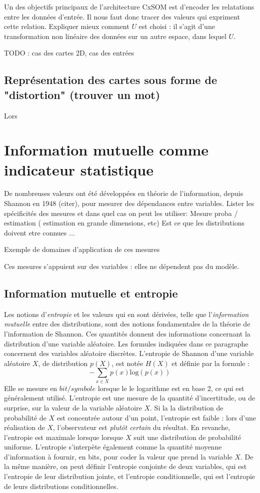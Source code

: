 Un des objectifs principaux de l'architecture CxSOM est d'encoder les relatations entre les données d'entrée. Il nous faut donc tracer des valeurs qui expriment cette relation. 
Expliquer mieux comment $U$ est choisi : il s'agit d'une transformation non linéaire des données sur un autre espace, dans lequel $U$.

TODO : cas des cartes 2D, cas des entrées 


\subsection{Représentation des cartes sous forme de "distortion" (trouver un mot)}

Lors


\section{Information mutuelle comme indicateur statistique}

De nombreuses valeurs ont été développées en théorie de l'information, depuis Shannon en 1948 (citer), pour mesurer des dépendances entre variables.
Lister les spécificités des mesures et dans quel cas on peut les utiliser: 
Mesure proba / estimation ( estimation en grande dimensions, etc)
Est ce que les distributions doivent etre connues ...

Exemple de domaines d'application de ces mesures

Ces mesures s'appuient sur des variables : elles ne dépendent pas du modèle. 

\subsection{Information mutuelle et entropie}

Les notions d'\emph{entropie} et les valeurs qui en sont dérivées, telle que l'\emph{information mutuelle} entre des distributions, sont des notions fondamentales de la théorie de l'information de Shannon. Ces quantités donnent des informations concernant la distribution d'une variable aléatoire.
Les formules indiquées dans ce paragraphe concernent des variables aléatoire discrètes. 
L'entropie de Shannon d'une variable aléatoire $X$, de distribution $p(X)$, est notée $H(X)$ et définie par la formule : 
$$ - \sum_{x \in X}{p(x)\textrm{log}(p(x))}$$
Elle se mesure en $bit/symbole$ lorsque le le logarithme est en base 2, ce qui est généralement utilisé. 
L'entropie est une mesure de la quantité d'incertitude, ou de surprise, sur la valeur de la variable aléatoire $X$. Si la la distribution de probabilité de $X$ est concentrée autour d'un point, l'entropie est faible : lors d'une réalisation de $X$, l'observateur est \emph{plutôt certain} du résultat. En revanche, l'entropie est maximale lorsque lorsque $X$ suit une distribution de probabilité uniforme.
L'entropie s'interpète également comme la quantité moyenne d'information à fournir, en bits, pour coder la valeur que prend la variable $X$.
De la même manière, on peut définir l'entropie conjointe de deux variables, qui est l'entropie de leur distribution jointe, et l'entropie conditionnelle, qui est l'entropie de leurs distributions conditionnelles.

